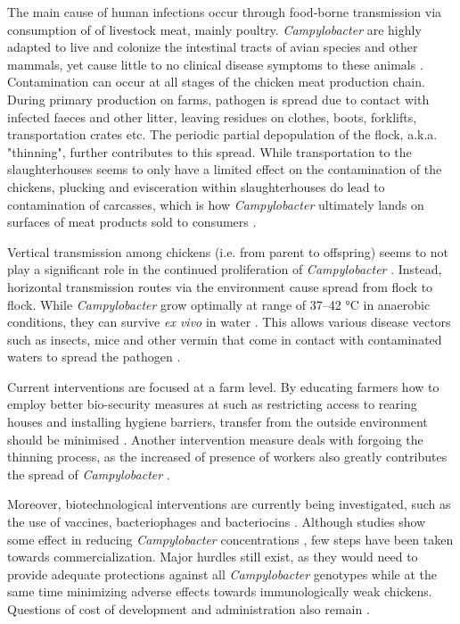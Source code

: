 The main cause of human infections occur through food-borne transmission via consumption of of livestock meat, mainly poultry\parencite{wilson_tracing_2008}. \textit{Campylobacter} are highly adapted to live and colonize the intestinal tracts of avian species and other mammals, yet cause little to no clinical disease symptoms to these animals \parencite{saif_diseases_2008}. Contamination can occur at all stages of the chicken meat production chain. During primary production on farms, pathogen is spread due to contact with infected faeces and other litter, leaving residues on clothes, boots, forklifts, transportation crates etc. The periodic partial depopulation of the flock, a.k.a. "thinning", further contributes to this spread. While transportation to the slaughterhouses seems to only have a limited effect on the contamination of the chickens, plucking and evisceration within slaughterhouses do lead to contamination of carcasses, which is how \textit{Campylobacter} ultimately lands on surfaces of meat products sold to consumers \parencite{skarp_campylobacteriosis_2015}.

Vertical transmission among chickens (i.e. from parent to offspring) seems to not play a significant role in the continued proliferation of \textit{Campylobacter} \parencite{callicott_lack_2006}. Instead, horizontal transmission routes via the environment cause spread from flock to flock. While \textit{Campylobacter} grow optimally at range of 37–42 °C in anaerobic conditions, they can survive \textit{ex vivo} in water \parencite{wilson_tracing_2008}. This allows various disease vectors such as insects, mice and other vermin that come in contact with contaminated waters to spread the pathogen \parencite{newell_sources_2003}.

Current interventions are focused at a farm level. By educating farmers how to employ better bio-security measures at such as restricting access to rearing houses and installing hygiene barriers, transfer from the outside environment should be minimised \parencite{hansson_knowledge_2018}. Another intervention measure deals with forgoing the thinning process, as the increased of presence of workers also greatly contributes the spread of \textit{Campylobacter} \parencite{lin_novel_2009}. 

Moreover, biotechnological interventions are currently being investigated, such as the use of vaccines, bacteriophages and bacteriocins \parencite{hansson_knowledge_2018}. Although studies show some effect in reducing \textit{Campylobacter} concentrations \parencite{wagenaar_phage_2005}, few steps have been taken towards commercialization. Major hurdles still exist, as they would need to provide adequate protections against all \textit{Campylobacter} genotypes while at the same time minimizing adverse effects towards immunologically weak chickens. Questions of cost of development and administration also remain \parencite{hansson_knowledge_2018}.

